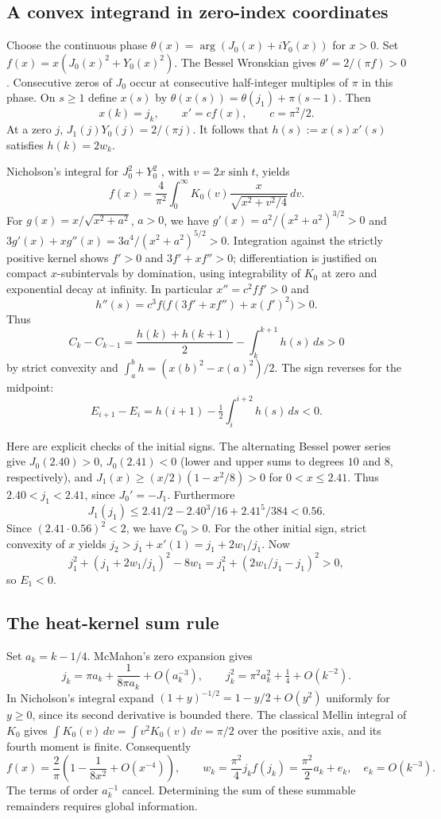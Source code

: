 \documentclass[11pt,a4paper]{article}
\numberwithin{equation}{section}
\theoremstyle{definition}
\theoremstyle{remark}
\begin{document}
\subsection{A convex integrand in zero-index coordinates}
Choose the continuous phase $\theta(x)=\arg(J_0(x)+iY_0(x))$ for $x>0$. Set $f(x)=x(J_0(x)^2+Y_0(x)^2)$. The Bessel Wronskian gives $\theta'=2/(\pi f)>0$. Consecutive zeros of $J_0$ occur at consecutive half-integer multiples of $\pi$ in this phase. On $s\ge1$ define $x(s)$ by $\theta(x(s))=\theta(j_1)+\pi(s-1)$. Then
\[
 x(k)=j_k,\qquad x'=c f(x),\qquad c=\pi^2/2.
\]
At a zero $j$, $J_1(j)Y_0(j)=2/(\pi j)$. It follows that $h(s):=x(s)x'(s)$ satisfies $h(k)=2w_k$.

Nicholson's integral for $J_0^2+Y_0^2$ \cite{r36showa:dlmf}, with $v=2x\sinh t$, yields
\[
 f(x)=\frac4{\pi^2}\int_0^\infty K_0(v)
           \frac{x}{\sqrt{x^2+v^2/4}}\,dv .
\]
For $g(x)=x/\sqrt{x^2+a^2}$, $a>0$, we have $g'(x)=a^2/(x^2+a^2)^{3/2}>0$ and
$3g'(x)+xg''(x)=3a^4/(x^2+a^2)^{5/2}>0$.
Integration against the strictly positive kernel shows $f'>0$ and $3f'+xf''>0$; differentiation is justified on compact $x$-subintervals by domination, using integrability of $K_0$ at zero and exponential decay at infinity. In particular $x''=c^2ff'>0$ and
\[
 h''(s)=c^3 f\big(f(3f'+xf'')+x(f')^2\big)>0.
\]
Thus
\[
 C_k-C_{k-1}=\frac{h(k)+h(k+1)}2-\int_k^{k+1} h(s)\,ds>0
\]
by strict convexity and $\int_a^b h=(x(b)^2-x(a)^2)/2$. The sign reverses for the midpoint:
\[
 E_{i+1}-E_i=h(i+1)-\tfrac12\int_i^{i+2}h(s)\,ds<0 .
\]

Here are explicit checks of the initial signs. The alternating Bessel power series give $J_0(2.40)>0$, $J_0(2.41)<0$ (lower and upper sums to degrees $10$ and $8$, respectively), and $J_1(x)\ge(x/2)(1-x^2/8)>0$ for $0<x\le2.41$. Thus $2.40<j_1<2.41$, since $J_0'=-J_1$. Furthermore
\[
 J_1(j_1)\le 2.41/2-2.40^3/16+2.41^5/384<0.56 .
\]
Since $(2.41\cdot0.56)^2<2$, we have $C_0>0$. For the other initial sign, strict convexity of $x$ yields $j_2>j_1+x'(1)=j_1+2w_1/j_1$. Now
\[
 j_1^2+(j_1+2w_1/j_1)^2-8w_1
 =j_1^2+ (2w_1/j_1-j_1)^2>0 ,
\]
so $E_1<0$.

\subsection{The heat-kernel sum rule}
Set $a_k=k-1/4$. McMahon's zero expansion \cite{r36showa:dlmf} gives
\[
 j_k=\pi a_k+\frac1{8\pi a_k}+O(a_k^{-3}),\qquad
 j_k^2=\pi^2 a_k^2+\tfrac14+O(k^{-2}) .
\]
In Nicholson's integral expand $(1+y)^{-1/2}=1-y/2+O(y^2)$ uniformly for $y\ge0$, since its second derivative is bounded there. The classical Mellin integral of $K_0$ gives $\int K_0(v)\,dv=\int v^2 K_0(v)\,dv=\pi/2$ over the positive axis, and its fourth moment is finite. Consequently
\[
 f(x)=\frac2\pi\left(1-\frac1{8x^2}+O(x^{-4})\right),\qquad
 w_k=\frac{\pi^2}4 j_k f(j_k)=\frac{\pi^2}2 a_k+e_k,\quad
 e_k=O(k^{-3}).
\]
The terms of order $a_k^{-1}$ cancel. Determining the sum of these summable remainders requires global information.
\end{document}
